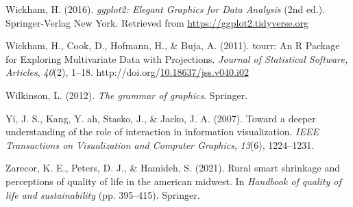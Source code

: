 \documentclass[print]{nuthesis}
\newlength{\cslhangindent}
\newenvironment{CSLReferences}[2]%
{\setlength{\parindent}{0pt}%
\everypar{\setlength{\hangindent}{\cslhangindent}}\ignorespaces}%
{\par}
\begin{document}
\begin{CSLReferences}{1}{0}
\leavevmode{}%
Wickham, H. (2016). \emph{{ggplot2: Elegant Graphics for Data Analysis}} (2nd ed.). Springer-Verlag New York. Retrieved from \url{https://ggplot2.tidyverse.org}

\leavevmode{}%
Wickham, H., Cook, D., Hofmann, H., \& Buja, A. (2011). {tourr: An R Package for Exploring Multivariate Data with Projections}. \emph{Journal of Statistical Software, Articles}, \emph{40}(2), 1--18. http://doi.org/\href{https://doi.org/10.18637/jss.v040.i02}{10.18637/jss.v040.i02}

\leavevmode{}%
Wilkinson, L. (2012). \emph{The grammar of graphics}. Springer.

\leavevmode{}%
Yi, J. S., Kang, Y. ah, Stasko, J., \& Jacko, J. A. (2007). Toward a deeper understanding of the role of interaction in information visualization. \emph{IEEE Transactions on Visualization and Computer Graphics}, \emph{13}(6), 1224--1231.

\leavevmode{}%
Zarecor, K. E., Peters, D. J., \& Hamideh, S. (2021). Rural smart shrinkage and perceptions of quality of life in the american midwest. In \emph{Handbook of quality of life and sustainability} (pp. 395--415). Springer.

\end{CSLReferences}


\backmatter

% 






\end{document}
